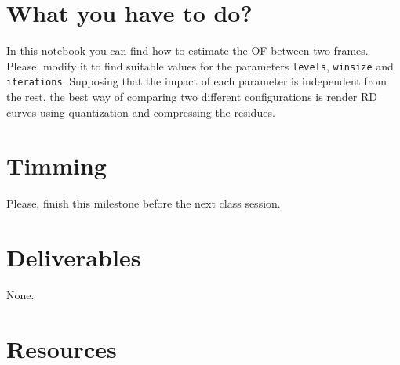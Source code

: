 \section{What you have to do?}

In this
\href{https://github.com/Sistemas-Multimedia/Sistemas-Multimedia.github.io/blob/master/milestones/10-ME/optical_flow.ipynb}{notebook}
you can find how to estimate the OF between two frames. Please, modify
it to find suitable values for the parameters \texttt{levels},
\texttt{winsize} and \texttt{iterations}. Supposing that the impact of
each parameter is independent from the rest, the best way of comparing
two different configurations is render RD curves using quantization
and compressing the residues.

\section{Timming}

Please, finish this milestone before the next class session.

\section{Deliverables}

None.

\section{Resources}

\renewcommand{\addcontentsline}[3]{}%


